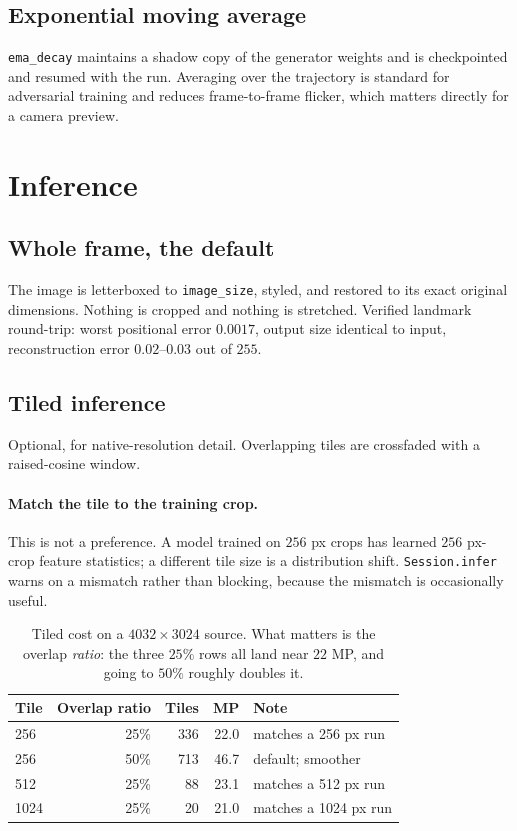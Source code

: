 \documentclass[11pt,a4paper]{article}
\newcommand{\code}[1]{\texttt{#1}}
\begin{document}
\subsection{Exponential moving average}

\code{ema\_decay} maintains a shadow copy of the generator weights and is
checkpointed and resumed with the run. Averaging over the trajectory is standard
for adversarial training and reduces frame-to-frame flicker, which matters
directly for a camera preview.

\section{Inference}

\subsection{Whole frame, the default}

The image is letterboxed to \code{image\_size}, styled, and restored to its exact
original dimensions. Nothing is cropped and nothing is stretched. Verified
landmark round-trip: worst positional error $0.0017$, output size identical to
input, reconstruction error $0.02$--$0.03$ out of $255$.

\subsection{Tiled inference}

Optional, for native-resolution detail. Overlapping tiles are crossfaded with a
raised-cosine window.

\paragraph{Match the tile to the training crop.} This is not a preference. A model
trained on $256$ px crops has learned $256$ px-crop feature statistics; a
different tile size is a distribution shift. \code{Session.infer} warns on a
mismatch rather than blocking, because the mismatch is occasionally useful.

\begin{table}[h]
\centering
\begin{tabular}{@{}lrrrl@{}}
\toprule
Tile & Overlap ratio & Tiles & MP & Note \\
\midrule
256 & 25\% & 336 & 22.0 & matches a 256 px run \\
256 & 50\% & 713 & 46.7 & default; smoother \\
512 & 25\% & 88  & 23.1 & matches a 512 px run \\
1024& 25\% & 20  & 21.0 & matches a 1024 px run \\
\bottomrule
\end{tabular}
\caption{Tiled cost on a $4032\times3024$ source. What matters is the overlap
\emph{ratio}: the three $25\%$ rows all land near $22$ MP, and going to $50\%$
roughly doubles it.}
\label{tab:tiled}
\end{table}
\end{document}
